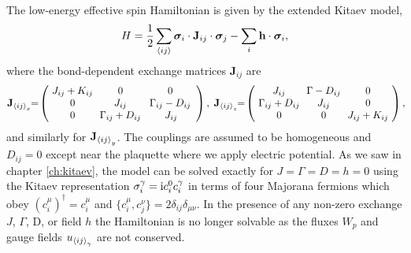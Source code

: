 The low-energy effective spin Hamiltonian is given by the extended Kitaev  model,
 \begin{equation}
     H =\frac{1}{2}\sum_{ \braket{ ij} }   \bm{\sigma}_i \cdot  \mathbf{J}_{ij} \cdot\bm{\sigma}_j   -\sum_i \mathbf h\cdot \boldsymbol\sigma_i ,\label{Hwithfield}
\end{equation}
where the bond-dependent exchange matrices $\mathbf{J}_{ij}$ are
\begin{equation}
\mathbf{J}_{\braket{ij}_x} \!\!=\!
    \left( \begin{array}{ccc}
        \!J_{ij}+K_{ij}\! & 0 & 0  \\
        0 & \!J_{ij}\! & \Gamma_{ij} - D_{ij} \\
        0 & \!\Gamma_{ij}+D_{ij}\! & J_{ij}\!
    \end{array}\right), \;
\mathbf{J}_{\braket{ij}_z} \!\!=\!
    \left( \begin{array}{ccc}
        \!J_{ij}\!& \!\Gamma-D_{ij}\! & 0  \\
        \!\Gamma_{ij}+D_{ij}\! & J_{ij} & 0 \\
        0 & 0 & \!J_{ij} +K_{ij}\!
    \end{array}\right),\!\! \label{eq:J-DM}
\end{equation}
and similarly for $\mathbf{J}_{\braket{ij}_y}$. The couplings are assumed to be homogeneous and $D_{ij}=0$ except near the plaquette where we apply electric potential.
As we saw in chapter \ref{ch:kitaev},  the model can be solved exactly for $J=\Gamma=D=h=0$ using the Kitaev representation  $\sigma_i^\gamma =
\mathrm{i}  c_i^0 c_i^\gamma$ in terms of  four Majorana fermions which obey $(c_i^\mu)^\dagger=c_i^\mu$ and $\{ c^\mu_i, c^\nu_j \} = 2\delta_{ij}\delta_{\mu\nu}$.
In the presence of any non-zero exchange $J$, $\Gamma$, D, or field $h$  the Hamiltonian is no longer solvable as the fluxes $W_p$ and gauge fields $u_{\braket{ij}_\gamma}$ are not conserved.

